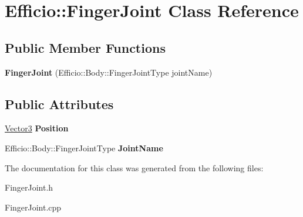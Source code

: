 \hypertarget{class_efficio_1_1_finger_joint}{}\section{Efficio\+:\+:Finger\+Joint Class Reference}
\label{class_efficio_1_1_finger_joint}
\subsection*{Public Member Functions}
\begin{DoxyCompactItemize}
\item 
\hypertarget{class_efficio_1_1_finger_joint_a907594a1a38f6e67c65a76ba2b9d23b5}{}\label{class_efficio_1_1_finger_joint_a907594a1a38f6e67c65a76ba2b9d23b5} 
{\bfseries Finger\+Joint} (Efficio\+::\+Body\+::\+Finger\+Joint\+Type joint\+Name)
\end{DoxyCompactItemize}
\subsection*{Public Attributes}
\begin{DoxyCompactItemize}
\item 
\hypertarget{class_efficio_1_1_finger_joint_a8a0ae42e54b38ab49019330560c881c1}{}\label{class_efficio_1_1_finger_joint_a8a0ae42e54b38ab49019330560c881c1} 
\hyperlink{class_efficio_1_1_vector3}{Vector3} {\bfseries Position}
\item 
\hypertarget{class_efficio_1_1_finger_joint_a7de278b4f129047aa7049f75317ffd89}{}\label{class_efficio_1_1_finger_joint_a7de278b4f129047aa7049f75317ffd89} 
Efficio\+::\+Body\+::\+Finger\+Joint\+Type {\bfseries Joint\+Name}
\end{DoxyCompactItemize}


The documentation for this class was generated from the following files\+:\begin{DoxyCompactItemize}
\item 
Finger\+Joint.\+h\item 
Finger\+Joint.\+cpp\end{DoxyCompactItemize}
